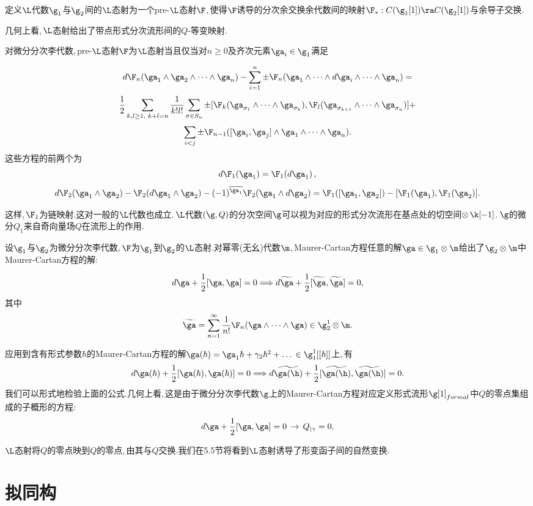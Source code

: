 定义$\L$代数$\g_1$与$\g_2$间的$\L$态射为一个pre-$\L$态射$\F$,\,使得$\F$诱导的分次余交换余代数间的映射$\F_*
 :C(\g_1[1])\ra C(\g_2[1])$与余导子交换.

几何上看,\,$\L$态射给出了带点形式分次流形间的$Q$-等变映射.

对微分分次李代数,\,pre-$\L$态射$\F$为$\L$态射当且仅当对$n\ge 0$及齐次元素$\ga_i\in \g_1$满足

$$ d\F_n(\ga_1\wedge \ga_2\wedge\dots\wedge\ga_n)-\sum_{i=1}^n \pm \F_n(
\ga_1\wedge\dots \wedge d\ga_i\wedge\dots \wedge \ga_n)=$$
$${1\over 2}\sum_{k,l\ge 1,\,\,k+l=n} {1\over k!l!}\sum_{\sigma\in 
S_n}
\pm [\F_k(\ga_{\sigma_1}\wedge\dots\wedge\ga_{\sigma_k}),\F_l(\ga_
{\sigma_{k+1}}\wedge
\dots\wedge \ga_{\sigma_n})]+$$$$\sum_{i<j}\pm \F_{n-1}([\ga_i,\ga_j]
\wedge\ga_1
\wedge\dots\wedge\ga_n).$$
这些方程的前两个为
$$d \F_1(\ga_1)=\F_1(d\ga_1)\,,$$
$$d\F_2(\ga_1\wedge\ga_2)-\F_2(d\ga_1\wedge\ga_2)-(-1)^{\overline{\ga_1}}\F_2
(\ga_1\wedge d\ga_2)=
\F_1([\ga_1,\ga_2])-[\F_1(\ga_1),\F_1(\ga_2)].$$

这样,\,$\F_1$为链映射.这对一般的$\L$代数也成立.\,$\L$代数$(\g,Q)$的分次空间$\g$可以视为对应的形式分次流形在基点处的切空间$\otimes \,\k[-1]$.\,$\g$的微分$Q_1$来自奇向量场$Q$在流形上的作用.

设$\g_1$与$\g_2$为微分分次李代数,\,$\F$为$\g_1$到$\g_2$的$\L$态射.对幂零(无幺)代数$\m$,\,Maurer-Cartan方程任意的解$\ga\in\g_1\otimes \m$给出了$\g_2\otimes\m$中Maurer-Cartan方程的解:\,

$$d\ga+{1\over 2}[\ga,\ga]=0
      \Longrightarrow
       d\widetilde{\ga}+{1\over 2}
     [\widetilde{\ga},\widetilde{\ga}]=0,$$
其中
$$
      \widetilde{\ga}=\sum_{n=1}^{\infty} {1\over n!} \F_n(\ga
     \wedge\dots\wedge\ga)\in
     \g_2^1\otimes\m.$$

应用到含有形式参数$\hbar$的Maurer-Cartan方程的解$\ga(\hbar)=\ga_1\hbar+\gamma_2\hbar^2+\dots\\
\in \g_1^1[[\hbar]]$上,\,有
$$d\ga(\hbar)+{1\over 2}
     [\ga(\hbar),\ga(\hbar)]=0\Longrightarrow
      d\widetilde{\ga(\h)}+{1\over 2}
     [\widetilde{\ga(\h)},\widetilde{\ga(\h)}]=0.$$
我们可以形式地检验上面的公式.几何上看,\,这是由于微分分次李代数$\g$上的Maurer-Cartan方程对应定义形式流形$\g[1]_{formal}$中$Q$的零点集组成的子概形的方程:\,
$$d\ga+{1\over 2}[\ga,\ga]=0
      \,\rightarrow \,Q_{|\gamma}=0.$$

$\L$态射将$Q$的零点映到$Q$的零点,\,由其与$Q$交换.我们在5.5节将看到$\L$态射诱导了形变函子间的自然变换.




\section{拟同构}

